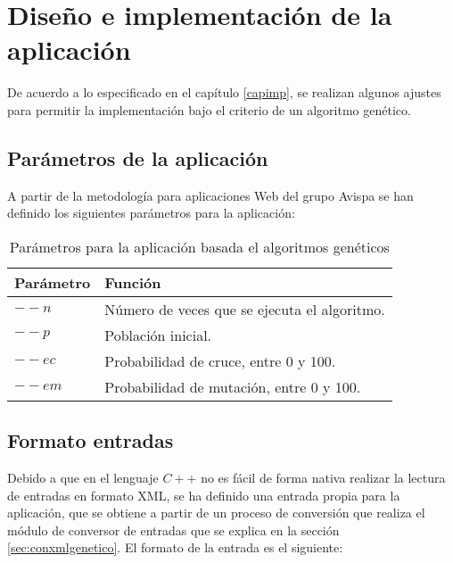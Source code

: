 \section{Diseño e implementación de la aplicación}

De acuerdo a lo especificado en el capítulo \ref{capimp}, se realizan algunos ajustes para permitir la implementación bajo el criterio de un algoritmo genético.

\subsection{Parámetros de la aplicación}

A partir de la metodología para aplicaciones Web del grupo Avispa se han definido los siguientes parámetros para la aplicación:

\begin{center}
\begin{longtable}{|p{7cm}|p{7cm}|}
	\caption{Parámetros para la aplicación basada el algoritmos genéticos}\\
	\hline
	\cellcolor[gray]{0.9} \textbf{Parámetro} & \cellcolor[gray]{0.9}\textbf{Función} \\
	\hline
	$--n$ & Número de veces que se ejecuta el algoritmo.\\
	\hline
	$--p$& Población inicial.\\
	\hline
	$--ec$ & Probabilidad de cruce, entre 0 y 100.\\
	\hline
	$--em$ & Probabilidad de mutación, entre 0 y 100.\\
	\hline
\end{longtable}	
\end{center}

\subsection{Formato entradas}

Debido a que en el lenguaje $C++$ no es fácil de forma nativa realizar la lectura de entradas en formato XML, se ha definido una entrada propia para la aplicación, que se obtiene a partir de un proceso de conversión que realiza el módulo de conversor de entradas que se explica en la sección \ref{sec:conxmlgenetico}. El formato de la entrada es el siguiente:

